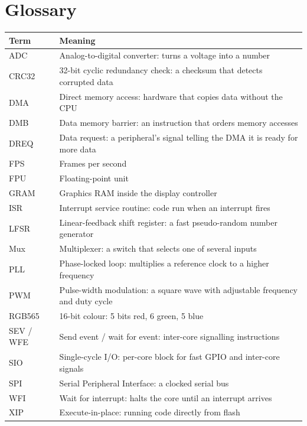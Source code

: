 \documentclass[11pt,a4paper]{article}
\begin{document}
\section{Glossary}
\begin{longtable}{lp{11.5cm}}
\toprule
\textbf{Term} & \textbf{Meaning} \\
\midrule\endhead
ADC & Analog-to-digital converter: turns a voltage into a number \\
CRC32 & 32-bit cyclic redundancy check: a checksum that detects corrupted data \\
DMA & Direct memory access: hardware that copies data without the CPU \\
DMB & Data memory barrier: an instruction that orders memory accesses \\
DREQ & Data request: a peripheral's signal telling the DMA it is ready for more data \\
FPS & Frames per second \\
FPU & Floating-point unit \\
GRAM & Graphics RAM inside the display controller \\
ISR & Interrupt service routine: code run when an interrupt fires \\
LFSR & Linear-feedback shift register: a fast pseudo-random number generator \\
Mux & Multiplexer: a switch that selects one of several inputs \\
PLL & Phase-locked loop: multiplies a reference clock to a higher frequency \\
PWM & Pulse-width modulation: a square wave with adjustable frequency and duty cycle \\
RGB565 & 16-bit colour: 5 bits red, 6 green, 5 blue \\
SEV / WFE & Send event / wait for event: inter-core signalling instructions \\
SIO & Single-cycle I/O: per-core block for fast GPIO and inter-core signals \\
SPI & Serial Peripheral Interface: a clocked serial bus \\
WFI & Wait for interrupt: halts the core until an interrupt arrives \\
XIP & Execute-in-place: running code directly from flash \\
\bottomrule
\end{longtable}
\end{document}
